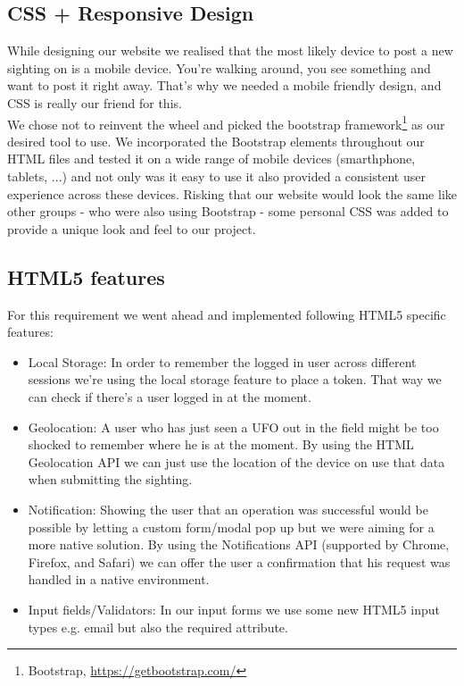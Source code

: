 \documentclass{article}
\begin{document}
\subsection{CSS + Responsive Design}
While designing our website we realised that the most likely device to post a new sighting on is a mobile device. You're walking around, you see something and want to post it right away. That's why we needed a mobile friendly design, and CSS is really our friend for this. \\

We chose not to reinvent the wheel and picked the bootstrap framework\footnote{ Bootstrap, \url{https://getbootstrap.com/}} as our desired tool to use.
We incorporated the Bootstrap elements throughout our HTML files and tested it on a wide range of mobile devices (smarthphone, tablets, ...) and not only was it easy to use it also provided a consistent user experience across these devices. Risking that our website would look the same like other groups - who were also using Bootstrap - some personal CSS was added to provide a unique look and feel to our project.

\subsection{HTML5 features}
For this requirement we went ahead and implemented following HTML5 specific features:
\begin{itemize}
\item Local Storage: In order to remember the logged in user across different sessions we're using the local storage feature to place a token. That way we can check if there's a user logged in at the moment.
\item Geolocation: A user who has just seen a UFO out in the field might be too shocked to remember where he is at the moment. By using the HTML Geolocation API we can just use the location of the device on use that data when submitting the sighting.
\item Notification: Showing the user that an operation was successful would be possible by letting a custom form/modal pop up but we were aiming for a more native solution. By using the Notifications API (supported by Chrome, Firefox, and Safari) we can offer the user a confirmation that his request was handled in a native environment.
\item Input fields/Validators: In our input forms we use some new HTML5 input types e.g. email but also the required attribute.
\end{itemize}
\end{document}
